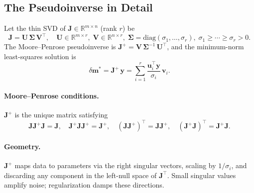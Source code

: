\subsection{The Pseudoinverse in Detail}\label{subsec:pseudo}
Let the thin SVD of $\mathbf{J}\in\mathbb{R}^{m\times n}$ (rank $r$) be
\[
\mathbf{J} = \mathbf{U}\,\bm{\Sigma}\,\mathbf{V}^\top, \quad
\mathbf{U}\in\mathbb{R}^{m\times r},\; \mathbf{V}\in\mathbb{R}^{n\times r},\;
\bm{\Sigma}=\mathrm{diag}(\sigma_1,\ldots,\sigma_r),\; \sigma_1\ge\cdots\ge\sigma_r>0.
\]
The Moore--Penrose pseudoinverse is $\mathbf{J}^+ = \mathbf{V}\,\bm{\Sigma}^{-1}\,\mathbf{U}^\top$, and the minimum-norm least-squares solution is
\[
\delta\mathbf{m}^* = \mathbf{J}^+\,\mathbf{y}
= \sum_{i=1}^r \frac{\mathbf{u}_i^\top \mathbf{y}}{\sigma_i}\,\mathbf{v}_i.
\]
\paragraph{Moore--Penrose conditions.} $\mathbf{J}^+$ is the unique matrix satisfying
\[
\mathbf{J}\mathbf{J}^+\mathbf{J}=\mathbf{J},\quad
\mathbf{J}^+\mathbf{J}\mathbf{J}^+=\mathbf{J}^+,\quad
(\mathbf{J}\mathbf{J}^+)^\top=\mathbf{J}\mathbf{J}^+,\quad
(\mathbf{J}^+\mathbf{J})^\top=\mathbf{J}^+\mathbf{J}.
\]
\paragraph{Geometry.} $\mathbf{J}^+$ maps data to parameters via the right singular vectors, scaling by $1/\sigma_i$, and discarding any component in the left-null space of $\mathbf{J}^\top$. Small singular values amplify noise; regularization damps these directions.

